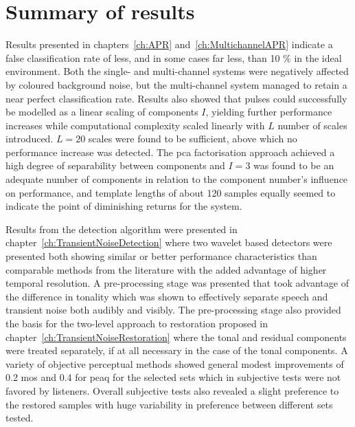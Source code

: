 \section{Summary of results}
Results presented in chapters~\ref{ch:APR} and~\ref{ch:MultichannelAPR} indicate a false classification rate of less, and in some cases far less, than 10 \% in the ideal environment. Both the single- and multi-channel systems were negatively affected by coloured background noise, but the multi-channel system managed to retain a near perfect classification rate. Results also showed that pulses could successfully be modelled as a linear scaling of components $I$, yielding further performance increases while computational complexity scaled linearly with $L$ number of scales introduced. $L=20$ scales were found to be sufficient, above which no performance increase was detected. The \gls{pca} factorisation approach achieved a high degree of separability between components and $I=3$ was found to be an adequate number of components in relation to the component number's influence on performance, and template lengths of about 120 samples equally seemed to indicate the point of diminishing returns for the system.

Results from the detection algorithm were presented in chapter~\ref{ch:TransientNoiseDetection} where two wavelet based detectors were presented both showing similar or better performance characteristics than comparable methods from the literature with the added advantage of higher temporal resolution. A pre-processing stage was presented that took advantage of the difference in tonality which was shown to effectively separate speech and transient noise both audibly and visibly. The pre-processing stage also provided the basis for the two-level approach to restoration proposed in chapter~\ref{ch:TransientNoiseRestoration} where the tonal and residual components were treated separately, if at all necessary in the case of the tonal components. A variety of objective perceptual methods showed general modest improvements of 0.2 \gls{mos} and 0.4 for \gls{peaq} for the selected sets which in subjective tests were not favored by listeners. Overall subjective tests also revealed a slight preference to the restored samples with huge variability in preference between different sets tested.

